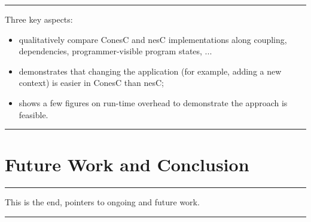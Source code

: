 \documentclass[10pt, conference, compsocconf]{IEEEtran}
\begin{document}
\hrule
\noindent Three key aspects:
\begin{itemize}
\item qualitatively compare ConesC and nesC implementations along
  coupling, dependencies, programmer-visible program states, ...
\item demonstrates that changing the application (for example, adding
  a new context) is easier in ConesC than nesC;
\item shows a few figures on run-time overhead to demonstrate the
  approach is feasible.
\end{itemize}
\hrule




\section{Future Work and Conclusion}
\label{sec:ending}

\hrule
This is the end, pointers to ongoing and future work.
\hrule


\IEEEpeerreviewmaketitle

\end{document}
